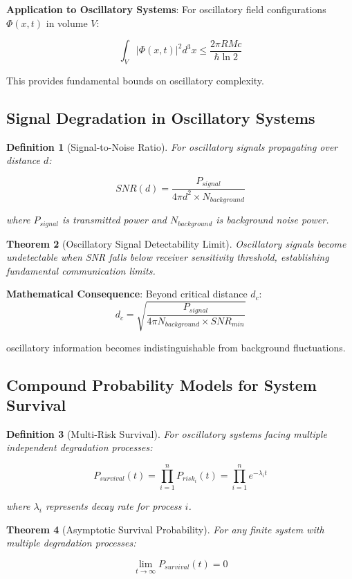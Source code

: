 \documentclass[11pt]{article}
\newtheorem{theorem}{Theorem}[section]
\newtheorem{definition}[theorem]{Definition}
\theoremstyle{remark}
\begin{document}
\textbf{Application to Oscillatory Systems}: For oscillatory field configurations $\Phi(x,t)$ in volume $V$:

$$\int_V |\Phi(x,t)|^2 d^3x \leq \frac{2\pi R M c}{\hbar \ln 2}$$

This provides fundamental bounds on oscillatory complexity.

\subsection{Signal Degradation in Oscillatory Systems}

\begin{definition}[Signal-to-Noise Ratio]
For oscillatory signals propagating over distance $d$:

$$SNR(d) = \frac{P_{signal}}{4\pi d^2 \times N_{background}}$$

where $P_{signal}$ is transmitted power and $N_{background}$ is background noise power.
\end{definition}

\begin{theorem}[Oscillatory Signal Detectability Limit]
Oscillatory signals become undetectable when SNR falls below receiver sensitivity threshold, establishing fundamental communication limits.
\end{theorem}

\textbf{Mathematical Consequence}: Beyond critical distance $d_c$:
$$d_c = \sqrt{\frac{P_{signal}}{4\pi N_{background} \times SNR_{min}}}$$

oscillatory information becomes indistinguishable from background fluctuations.

\subsection{Compound Probability Models for System Survival}

\begin{definition}[Multi-Risk Survival]
For oscillatory systems facing multiple independent degradation processes:

$$P_{survival}(t) = \prod_{i=1}^{n} P_{risk_i}(t) = \prod_{i=1}^{n} e^{-\lambda_i t}$$

where $\lambda_i$ represents decay rate for process $i$.
\end{definition}

\begin{theorem}[Asymptotic Survival Probability]
For any finite system with multiple degradation processes:

$$\lim_{t \to \infty} P_{survival}(t) = 0$$
\end{theorem}
\end{document}
